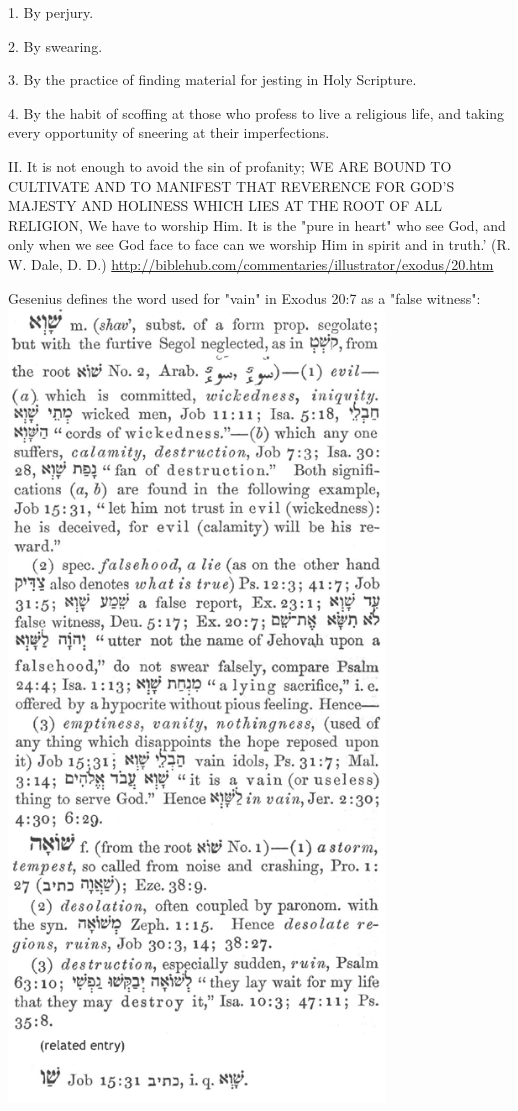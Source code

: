 \documentclass[11pt]{article}
\begin{document}
\begin{thebibliography}{37}
1. By perjury.\newline

2. By swearing.\newline

3. By the practice of finding material for jesting in Holy Scripture.\newline

4. By the habit of scoffing at those who profess to live a religious life, and taking every opportunity of sneering at their imperfections.\newline

II. It is not enough to avoid the sin of profanity; WE ARE BOUND TO CULTIVATE AND TO MANIFEST THAT REVERENCE FOR GOD'S MAJESTY AND HOLINESS WHICH LIES AT THE ROOT OF ALL RELIGION, We have to worship Him. It is the "pure in heart" who see God, and only when we see God face to face can we worship Him in spirit and in truth.'\newline
(R. W. Dale, D. D.)
\url{http://biblehub.com/commentaries/illustrator/exodus/20.htm}

Gesenius defines the word used for "vain" in Exodus 20:7 as a "false witness":
\includegraphics[width=10cm]{vain_hebrew}


\end{thebibliography}
\end{document}
